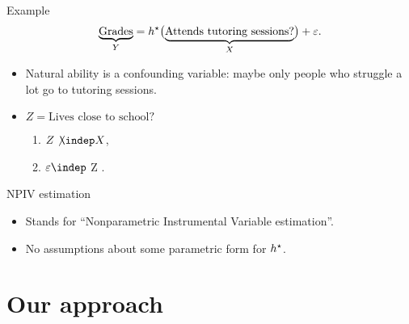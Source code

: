 \documentclass[aspectratio=169]{beamer}
\begin{document}
    \begin{frame}{Example}
        \begin{equation*}
            \underbrace{\text{Grades}}_{Y} = h^{ \star } \bigl( \underbrace{ \text{Attends tutoring sessions?} }_{X} \bigr) + \varepsilon
        .\end{equation*}
        \begin{itemize}
            \item<2-> Natural ability is a confounding variable: maybe only people who struggle a lot go to tutoring sessions.
            \item<3-> $ Z = \text{Lives close to school?} $
                \begin{enumerate}
                    \item<4-> $ Z \not\kern-1pt\indep X $,
                    \item<4-> $ \varepsilon \indep $ Z $ $.
                \end{enumerate}
        \end{itemize}
    \end{frame}

    \begin{frame}{NPIV estimation}
        \begin{itemize}
            \item<1-> Stands for ``Nonparametric Instrumental Variable estimation''.
            \item<2-> No assumptions about some parametric form for $ h^{ \star } $.
        \end{itemize}
    \end{frame}

    \section{Our approach}

\end{document}
